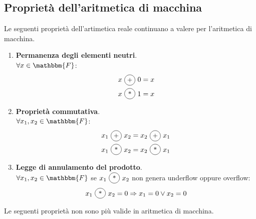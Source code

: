 \documentclass[12pt]{report}
\newcommand{\circled}[1]{%
	\begin{tikzpicture}[baseline=(char.base)]
		\node[shape=circle, draw, inner sep=1.2pt, minimum size=1.5em] (char) {\small #1};
	\end{tikzpicture}%
}
\begin{document}
\subsection{Proprietà dell'aritmetica di macchina}
Le seguenti proprietà dell'artimetica reale continuano a valere per l'aritmetica di macchina.
\begin{enumerate}
	\item \textbf{Permanenza degli elementi neutri}. \\
	$\forall x \in \mathbbm{F}$:
	\begin{align*}
	x\ \circled{+}\ 0 &= x \\
	x\ \circled{*}\ 1 &= x
	\end{align*}
	\item \textbf{Proprietà commutativa}. \\
	$\forall x_1, x_2 \in \mathbbm{F}$:
	\begin{align*}
		x_1\ \circled{+}\ x_2 &= x_2\ \circled{+}\ x_1 \\
		x_1\ \circled{*}\ x_2 &= x_2\ \circled{*}\ x_1
	\end{align*}
	\item \textbf{Legge di annulamento del prodotto}. \\
	$\forall x_1, x_2 \in \mathbbm{F}$ se $x_1\ \circled{*}\ x_2$ non genera underflow oppure overflow:
	\[
	x_1\ \circled{*}\ x_2 = 0 \Rightarrow x_1 = 0 \vee x_2 = 0
	\]
\end{enumerate}
Le seguenti proprietà non sono più valide in aritmetica di macchina.
\end{document}
